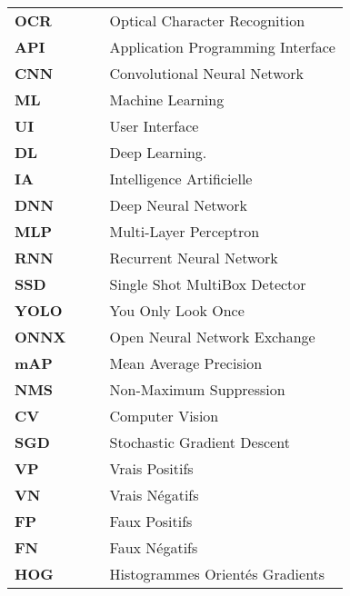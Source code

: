 \begin{tabular}{llll}
\textbf{OCR} & & & Optical Character Recognition\\
\textbf{API} & & & Application Programming Interface\\
\textbf{CNN} & & & Convolutional Neural Network\\
\textbf{ML} & & & Machine Learning\\
\textbf{UI} & & & User Interface\\
\textbf{DL} & & & Deep Learning.\\
\textbf{IA} & & & Intelligence Artificielle\\
\textbf{DNN} & & & Deep Neural Network\\
\textbf{MLP} & & & Multi-Layer Perceptron\\
\textbf{RNN} & & & Recurrent Neural Network\\
\textbf{SSD} & & & Single Shot MultiBox Detector\\
\textbf{YOLO} & & & You Only Look Once \\
\textbf{ONNX} & & &  Open Neural Network Exchange\\
\textbf{mAP} & & & Mean Average Precision \\
\textbf{NMS} & & & Non-Maximum Suppression  \\
\textbf{CV} & & & Computer Vision\\
\textbf{SGD} & & & Stochastic Gradient Descent\\
\textbf{VP} & & & Vrais Positifs\\
\textbf{VN} & & & Vrais Négatifs \\
\textbf{FP} & & & Faux Positifs\\
\textbf{FN} & & & Faux Négatifs \\
\textbf{HOG} & & & Histogrammes Orientés Gradients\\


\end{tabular}
